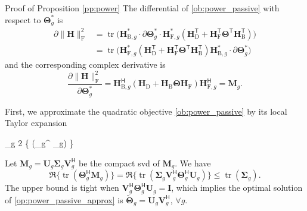 \documentclass[journal]{IEEEtran}
\DeclareMathOperator{\tr}{tr}
\begin{document}
\begin{appendix}
	\begin{subsection}{Proof of Proposition \ref{pp:power}}\label{ap:power}
		The differential of \eqref{ob:power_passive} with respect to $\mathbf{\Theta}_g^*$ is
		\begin{align*}
			\partial \lVert \mathbf{H} \rVert _\mathrm{F}^2
			 & = \tr\bigl(\mathbf{H}_{\mathrm{B},g}^* \cdot \partial \mathbf{\Theta}_g^* \cdot \mathbf{H}_{\mathrm{F},g}^* (\mathbf{H}_\mathrm{D}^\mathsf{T} + \mathbf{H}_\mathrm{F}^\mathsf{T} \mathbf{\Theta}^\mathsf{T} \mathbf{H}_\mathrm{B}^\mathsf{T})\bigr) \\
			 & = \tr\bigl(\mathbf{H}_{\mathrm{F},g}^* (\mathbf{H}_\mathrm{D}^\mathsf{T} + \mathbf{H}_\mathrm{F}^\mathsf{T} \mathbf{\Theta}^\mathsf{T} \mathbf{H}_\mathrm{B}^\mathsf{T}) \mathbf{H}_{\mathrm{B},g}^* \cdot \partial \mathbf{\Theta}_g^*\bigr)
		\end{align*}
		and the corresponding complex derivative is
		\begin{equation}
			\frac{\partial \lVert \mathbf{H} \rVert _\mathrm{F}^2}{\partial \mathbf{\Theta}_g^*} = \mathbf{H}_{\mathrm{B},g}^\mathsf{H} (\mathbf{H}_\mathrm{D} + \mathbf{H}_\mathrm{B} \mathbf{\Theta} \mathbf{H}_\mathrm{F}) \mathbf{H}_{\mathrm{F},g}^\mathsf{H} = \mathbf{M}_g.
		\end{equation}

		First, we approximate the quadratic objective \eqref{ob:power_passive} by its local Taylor expansion
		\begin{maxi!}
			{\scriptstyle{\mathbf{\Theta}}}{\sum_g 2 \Re\bigl\{ \tr(\mathbf{\Theta}_g^ _g) \bigr\}}{\label{op:power_passive_approx}}{\label{ob:power_passive_approx}}
		\end{maxi!}
		Let $\mathbf{M}_g = \mathbf{U}_g \mathbf{\Sigma}_g \mathbf{V}_g^\mathsf{H}$ be the compact \gls{svd} of $\mathbf{M}_g$.
		We have
		\begin{equation}
			\Re \bigl\{\tr(\mathbf{\Theta}_g^\mathsf{H} \mathbf{M}_g)\bigr\} = \Re \bigl\{ \tr(\mathbf{\Sigma}_g \mathbf{V}_g^\mathsf{H} \mathbf{\Theta}_g^\mathsf{H} \mathbf{U}_g) \bigr\} \le \tr(\mathbf{\Sigma}_g).
		\end{equation}
		The upper bound is tight when $\mathbf{V}_g^\mathsf{H} \mathbf{\Theta}_g^\mathsf{H} \mathbf{U}_g = \mathbf{I}$, which implies the optimal solution of \eqref{op:power_passive_approx} is $\tilde{\mathbf{\Theta}}_g = \mathbf{U}_g \mathbf{V}_g^\mathsf{H}$, $\forall g$.


\end{subsection}
\end{appendix}
\end{document}
